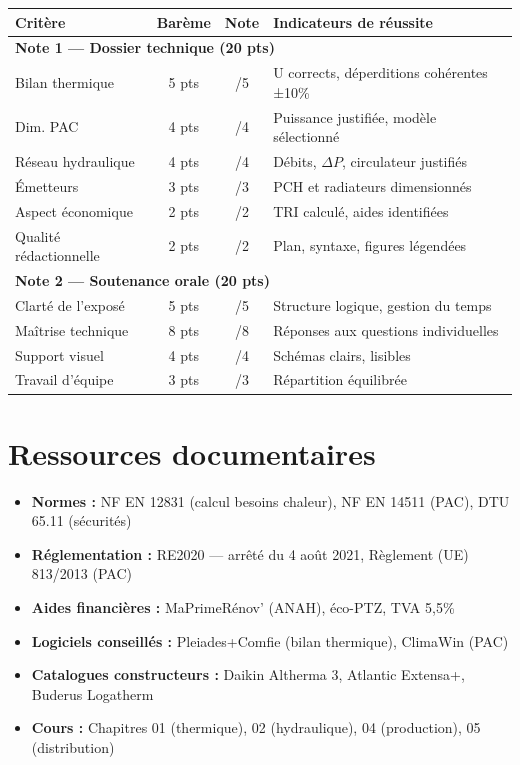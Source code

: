 \begin{center}
\begin{tabular}{p{5cm}ccp{5cm}}
  \toprule
  \textbf{Critère} & \textbf{Barème} & \textbf{Note} & \textbf{Indicateurs de réussite} \\
  \midrule
  \multicolumn{4}{l}{\textbf{Note 1 — Dossier technique (20 pts)}} \\
  \midrule
  Bilan thermique & 5 pts & /5 & U corrects, déperditions cohérentes ±10\% \\
  Dim. PAC & 4 pts & /4 & Puissance justifiée, modèle sélectionné \\
  Réseau hydraulique & 4 pts & /4 & Débits, $\Delta P$, circulateur justifiés \\
  Émetteurs & 3 pts & /3 & PCH et radiateurs dimensionnés \\
  Aspect économique & 2 pts & /2 & TRI calculé, aides identifiées \\
  Qualité rédactionnelle & 2 pts & /2 & Plan, syntaxe, figures légendées \\
  \midrule
  \multicolumn{4}{l}{\textbf{Note 2 — Soutenance orale (20 pts)}} \\
  \midrule
  Clarté de l'exposé & 5 pts & /5 & Structure logique, gestion du temps \\
  Maîtrise technique & 8 pts & /8 & Réponses aux questions individuelles \\
  Support visuel & 4 pts & /4 & Schémas clairs, lisibles \\
  Travail d'équipe & 3 pts & /3 & Répartition équilibrée \\
  \bottomrule
\end{tabular}
\end{center}

\section{Ressources documentaires}

\begin{itemize}
  \item \textbf{Normes :} NF EN 12831 (calcul besoins chaleur), NF EN 14511 (PAC), DTU 65.11 (sécurités)
  \item \textbf{Réglementation :} RE2020 — arrêté du 4 août 2021, Règlement (UE) 813/2013 (PAC)
  \item \textbf{Aides financières :} MaPrimeRénov' (ANAH), éco-PTZ, TVA 5,5\%
  \item \textbf{Logiciels conseillés :} Pleiades+Comfie (bilan thermique), ClimaWin (PAC)
  \item \textbf{Catalogues constructeurs :} Daikin Altherma 3, Atlantic Extensa+, Buderus Logatherm
  \item \textbf{Cours :} Chapitres 01 (thermique), 02 (hydraulique), 04 (production), 05 (distribution)
\end{itemize}

\finchapitre
